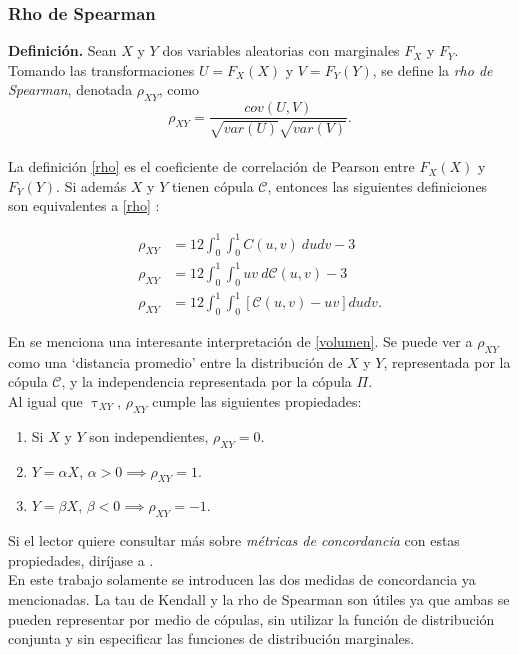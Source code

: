 \documentclass[11pt,a4paper]{article}
\begin{document}
\subsubsection*{Rho de Spearman}

\textbf{Definición.} Sean $X$ y $Y$ dos variables aleatorias con marginales $F_X$ y $F_Y$. Tomando las transformaciones $U = F_X(X)$ y $V = F_Y(Y)$, se define la \textit{rho de Spearman}, denotada $\rho_{XY}$, como
\begin{equation} \label{rho}
\rho_{XY} = \frac{cov(U, V)}{\sqrt{var(U)}\sqrt{var(V)}}.
\end{equation}\\

La definición \eqref{rho} es el coeficiente de correlación de Pearson entre $F_X(X)$ y $F_Y(Y)$. Si además $X$ y $Y$ tienen cópula $\mathcal{C}$, entonces las siguientes definiciones son equivalentes a \eqref{rho} \citep{nelsen}:

\begin{align}
\rho_{XY} &= 12\int_0^1 \int_0^1 C(u, v) \ dudv-3\\
\rho_{XY} &= 12\int_0^1 \int_0^1 uv \ d\mathcal{C}(u,v)-3\\
\rho_{XY} &= 12\int_0^1\int_0^1 \left[ \mathcal{C}(u, v) - uv \right] dudv \label{volumen}.
\end{align}

En \citet{nelsen} se menciona una interesante interpretación de \eqref{volumen}. Se puede ver a $\rho_{XY}$ como una `distancia promedio' entre la distribución de $X$ y $Y$, representada por la cópula $\mathcal{C}$, y la independencia representada por la cópula $\Pi$.\\

Al igual que $\uptau_{XY}$, $\rho_{XY}$ cumple las siguientes propiedades:

\begin{enumerate}
\item Si $X$ y $Y$ son independientes, $\rho_{XY} = 0$.
\item $Y = \alpha X$, $\alpha > 0 \implies \rho_{XY} = 1$.
\item $Y = \beta X$, $\beta < 0 \implies \rho_{XY} = -1$.
\end{enumerate}

Si el lector quiere consultar más sobre \textit{métricas de concordancia} con estas propiedades, diríjase a \citet{nelsen}.\\

En este trabajo solamente se introducen las dos medidas de concordancia ya mencionadas. La tau de Kendall y la rho de Spearman son útiles ya que ambas se pueden representar por medio de cópulas, sin utilizar la función de distribución conjunta y sin especificar las funciones de distribución marginales.\\
\end{document}
